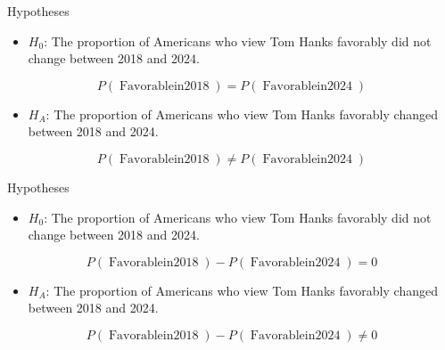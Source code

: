 \documentclass[
  ignorenonframetext,
]{beamer}
\providecommand{\tightlist}{%
  \setlength{\itemsep}{0pt}\setlength{\parskip}{0pt}}\usepackage{longtable,booktabs,array}
\begin{document}
\begin{frame}{Hypotheses}
\label{hypotheses-1}
\pause

\begin{itemize}
\tightlist
\item
  \(H_0\): The proportion of Americans who view Tom Hanks favorably did
  not change between 2018 and 2024.
\end{itemize}

\pause

\[P(\operatorname{Favorable in 2018}) = P(\operatorname{Favorable in 2024})\]

\pause

\begin{itemize}
\tightlist
\item
  \(H_A\): The proportion of Americans who view Tom Hanks favorably
  changed between 2018 and 2024.
\end{itemize}

\pause

\[P(\operatorname{Favorable in 2018}) \ne P(\operatorname{Favorable in 2024})\]
\end{frame}

\begin{frame}{Hypotheses}
\label{hypotheses-2}
\begin{itemize}
\tightlist
\item
  \(H_0\): The proportion of Americans who view Tom Hanks favorably did
  not change between 2018 and 2024.
\end{itemize}

\[P(\operatorname{Favorable in 2018}) - P(\operatorname{Favorable in 2024})=0\]

\begin{itemize}
\tightlist
\item
  \(H_A\): The proportion of Americans who view Tom Hanks favorably
  changed between 2018 and 2024.
\end{itemize}

\[P(\operatorname{Favorable in 2018}) - P(\operatorname{Favorable in 2024}) \ne 0\]
\end{frame}
\end{document}
